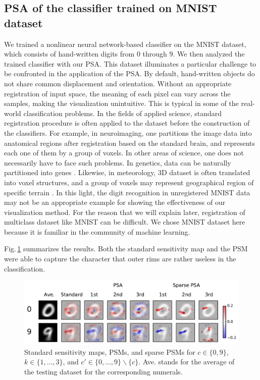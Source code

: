 \subsection{PSA of the classifier trained on MNIST dataset}
We trained a nonlinear neural network-based classifier on the MNIST
dataset, which consists of hand-written digits from $0$ through $9$.
%
We then analyzed the trained classifier with our PSA.
%
This dataset illuminates a particular challenge to be confronted in the application of the PSA.
%
By default, hand-written objects do not share common displacement and orientation.
%
Without an appropriate registration of input space,
the meaning of each pixel can vary across the samples, making the
visualization unintuitive.
%
This is typical in some of the real-world classification problems.
%
In the fields of applied science, standard registration procedure is
often applied to the dataset before the construction of the classifiers.
%
For example, in neuroimaging, one partitions the image data into anatomical
regions after registration based on the standard brain,
and represents each one of them by a group of voxels.
%
In other areas of science, one does not necessarily have to face such problems.
%
In genetics, data can be naturally partitioned into genes \cite{Yukinawa2009}.
%
Likewise, in meteorology, 3D dataset is often translated into voxel
structures, and a group of voxels may represent geographical region of
specific terrain \cite{Kontos2005}.
%
In this light, the digit recognition in unregistered MNIST data may not
be an appropriate example for showing the effectiveness of our visualization method.
For the reason that we will explain later, registration of multiclass
dataset like MNIST can be difficult.
%
We chose MNIST dataset here because it is familiar in the community of
machine learning.

Fig.\,\ref{fig:psms_mnist} summarizes the results.
%
Both the standard sensitivity map and the PSM were able to
capture the character that outer rims are rather useless in the classification.
\begin{figure}[htb]
 \centering
 \includegraphics[width=0.8\columnwidth]{./fig/fig5a.pdf}
 \caption{Standard sensitivity maps, PSMs, and sparse PSMs for
 $c \in \{0, 9\}$, $k \in \{1, \dots,  3\}$, and $c' \in \{0, \dots
 ,9\} \backslash \{c\}$.
 Ave. stands for the average of the testing dataset for the corresponding numerals.}
 \label{fig:psms_mnist}
\end{figure}

